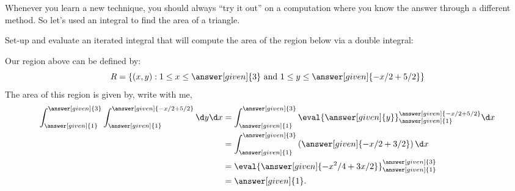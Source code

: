 \documentclass{ximera}
\begin{document}
Whenever you learn a new technique, you should always ``try it out''
on a computation where you know the answer through a different
method. So let's used an integral to find the area of a triangle.

\begin{example}
  Set-up and evaluate an iterated integral that will compute the area
  of the region below via a double integral:
  \begin{image}
  \end{image}
  \begin{explanation}
    Our region above can be defined by:
    \[
    R=\left\{(x,y):\text{$1\leq x\leq \answer[given]{3}$ and $1\leq y\leq \answer[given]{-x/2+5/2}$}\right\}
    \]
    The area of this region is given by, write with me, 
    \begin{align*}
      \int_{\answer[given]{1}}^{\answer[given]{3}}\int_{\answer[given]{1}}^{\answer[given]{-x/2+5/2}}\d y \d x &= \int_{\answer[given]{1}}^{\answer[given]{3}} \eval{\answer[given]{y}}_{\answer[given]{1}}^{\answer[given]{-x/2+5/2}} \d x\\
      &=  \int_{\answer[given]{1}}^{\answer[given]{3}} \left(\answer[given]{-x/2+3/2}\right) \d x\\
      &=  \eval{\answer[given]{-x^2/4+3x/2}}_{\answer[given]{1}}^{\answer[given]{3}}\\
      &= \answer[given]{1}. 
    \end{align*}
  \end{explanation}
\end{example}
\end{document}
